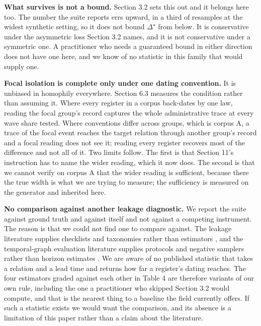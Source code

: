 \documentclass[twoside,11pt]{article}
\begin{document}
\textbf{What survives is not a bound.} Section 3.2 sets this out and it belongs here too. The number the suite reports errs upward, in a third of resamples at the widest synthetic setting, so it does not bound \(\Delta^{\star}\) from below. It is conservative under the asymmetric loss Section 3.2 names, and it is not conservative under a symmetric one. A practitioner who needs a guaranteed bound in either direction does not have one here, and we know of no statistic in this family that would supply one.

\textbf{Focal isolation is complete only under one dating convention.} It is unbiased in homophily everywhere. Section 6.3 measures the condition rather than assuming it. Where every register in a corpus back-dates by one law, reading the focal group's record captures the whole administrative trace at every wave share tested. Where conventions differ across groups, which is corpus A, a trace of the focal event reaches the target relation through another group's record and a focal reading does not see it; reading every register recovers most of the difference and not all of it. Two limits follow. The first is that Section 11's instruction has to name the wider reading, which it now does. The second is that we cannot verify on corpus A that the wider reading is sufficient, because there the true width is what we are trying to measure; the sufficiency is measured on the generator and inherited here.

\textbf{No comparison against another leakage diagnostic.} We report the suite against ground truth and against itself and not against a competing instrument. The reason is that we could not find one to compare against. The leakage literature supplies checklists and taxonomies rather than estimators \citep{kaufman,kapoor_leakage,reforms}, and the temporal-graph evaluation literature supplies protocols and negative samplers rather than horizon estimates \citep{ogb,tgb,poursafaei}. We are aware of no published statistic that takes a relation and a lead time and returns how far a register's dating reaches. The four estimators graded against each other in Table 4 are therefore variants of our own rule, including the one a practitioner who skipped Section 3.2 would compute, and that is the nearest thing to a baseline the field currently offers. If such a statistic exists we would want the comparison, and its absence is a limitation of this paper rather than a claim about the literature.
\end{document}
